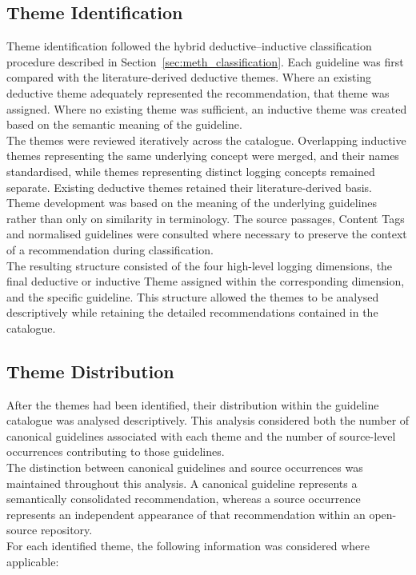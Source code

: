 \subsection{Theme Identification}

Theme identification followed the hybrid deductive–inductive classification procedure
described in Section~\ref{sec:meth_classification}. Each guideline was first compared
with the literature-derived deductive themes. Where an existing deductive theme
adequately represented the recommendation, that theme was assigned. Where no existing
theme was sufficient, an inductive theme was created based on the semantic meaning of
the guideline.
\\
The themes were reviewed iteratively across the catalogue. Overlapping inductive themes
representing the same underlying concept were merged, and their names standardised,
while themes representing distinct logging concepts remained separate. Existing
deductive themes retained their literature-derived basis.
\\
Theme development was based on the meaning of the underlying guidelines rather than
only on similarity in terminology. The source passages, Content Tags and
normalised guidelines were consulted where necessary to preserve the context of a
recommendation during classification.
\\
The resulting structure consisted of the four high-level logging dimensions, the final
deductive or inductive Theme assigned within the corresponding dimension, and the
specific guideline. This structure allowed the themes to be analysed descriptively
while retaining the detailed recommendations contained in the catalogue.

\subsection{Theme Distribution}

After the themes had been identified, their distribution within the guideline
catalogue was analysed descriptively. This analysis considered both the number of
canonical guidelines associated with each theme and the number of source-level
occurrences contributing to those guidelines.
\\
The distinction between canonical guidelines and source occurrences was maintained
throughout this analysis. A canonical guideline represents a semantically consolidated
recommendation, whereas a source occurrence represents an independent appearance of
that recommendation within an open-source repository.
\\
For each identified theme, the following information was considered where applicable:


